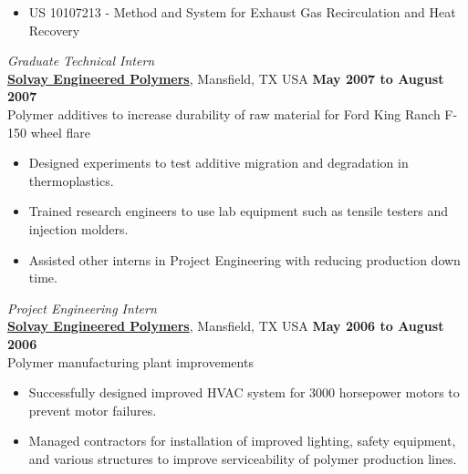 \documentclass[centered]{res}
\begin{document}
\begin{resume}
\begin{itemize}
\item US 10107213 - Method and System for Exhaust Gas Recirculation and Heat Recovery
\end{itemize} \vspace{-8pt}
%
\textit{Graduate Technical Intern} \\
\href{http://www.lyondellbasell.com/LandingPages/SolvayEngineeredPolymers}{\textbf{Solvay
    Engineered Polymers}}, Mansfield, TX USA 
\hfill \textbf{May 2007 to August 2007} \\
Polymer additives to increase durability of raw material for Ford King
Ranch F-150 wheel flare
\begin{itemize} \itemsep -2pt %
\item Designed experiments to test additive migration
  and degradation in thermoplastics.
\item Trained research engineers to use lab equipment such as tensile
  testers and injection molders.
\item Assisted other interns in Project Engineering with
  reducing production down time.
\end{itemize} \vspace{-8pt}
%
\textit{Project Engineering Intern} \\
\href{http://www.lyondellbasell.com/LandingPages/SolvayEngineeredPolymers}{\textbf{Solvay
    Engineered Polymers}}, Mansfield, TX USA 
\hfill \textbf{May 2006 to August 2006} \\
Polymer manufacturing plant improvements 
\begin{itemize} \itemsep -2pt %
\item Successfully designed improved HVAC system for 3000 horsepower
  motors to prevent motor failures.
\item Managed contractors for installation of improved lighting,
  safety equipment, and various structures to improve serviceability
  of polymer production lines.
\end{itemize} 
%

\end{resume}
\end{document}
